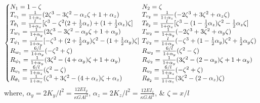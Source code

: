 \begin{equation*}
\left\{\arraycolsep=.2em\begin{array}{@{}ll}
N_1=1-\zeta&N_2=\zeta\\
T_{v_1}=\frac{1}{1+\alpha_z}(2\zeta^3-3\zeta^2-\alpha_z\zeta+1+\alpha_z)&T_{v_2}=\frac{1}{1+\alpha_z}(-2\zeta^3+3\zeta^2+\alpha_z\zeta)\\
T_{\theta_1}=\frac{l}{1+\alpha_z}[\zeta^3-\zeta^2(2+\frac{1}{2}\alpha_z)+(1+\frac{1}{2}\alpha_z)\zeta]&T_{\theta_2}=\frac{l}{1+\alpha_z}[\zeta^3-(1-\frac{1}{2}\alpha_z)\zeta^2-\frac{1}{2}\alpha_z\zeta]\\
T_{w_1}=\frac{1}{1+\alpha_y}(2\zeta^3-3\zeta^2-\alpha_y\zeta+1+\alpha_y)&T_{w_2}=\frac{1}{1+\alpha_y}(-2\zeta^3+3\zeta^2+\alpha_y\zeta)\\
T_{\psi_1}=\frac{l}{1+\alpha_y}[-\zeta^3+(2+\frac{1}{2}\alpha_y)\zeta^2-(1+\frac{1}{2}\alpha_y)\zeta]&T_{\psi_2}=\frac{l}{1+\alpha_y}(-\zeta^3+(1-\frac{1}{2}\alpha_y)\zeta^2+\frac{1}{2}\alpha_y\zeta)\\
R_{w_1}=\frac{6/l}{1+\alpha_y}(-\zeta^2+\zeta)&R_{w_2}=\frac{6/l}{1+\alpha_y}(\zeta^2-\zeta)\\
R_{\psi_1}=\frac{1}{1+\alpha_y}(3\zeta^2-(4+\alpha_y)\zeta+1+\alpha_y)&R_{\psi_2}=\frac{1}{1+\alpha_y}(3\zeta^2-(2-\alpha_y)\zeta+1+\alpha_y)\\
R_{v_1}=\frac{6/l}{1+\alpha_z}(\zeta^2-\zeta)&R_{v_2}=\frac{6/l}{1+\alpha_z}(-\zeta^2+\zeta)\\
R_{\theta_1}=\frac{1}{1+\alpha_z}(\zeta^3+3\zeta^2-(4+\alpha_z)\zeta+\alpha_z)&R_{\theta_2}=\frac{1}{1+\alpha_z}(3\zeta^2-(2-\alpha_z)\zeta)
\end{array}\right.
\end{equation*}
where, $ \alpha_y=2K_y/l^2=\frac{12EI_y}{\kappa GAl^2} $, $ \alpha_z=2K_z/l^2=\frac{12EI_z}{\kappa GAl^2} $, \& $ \zeta=x/l $
